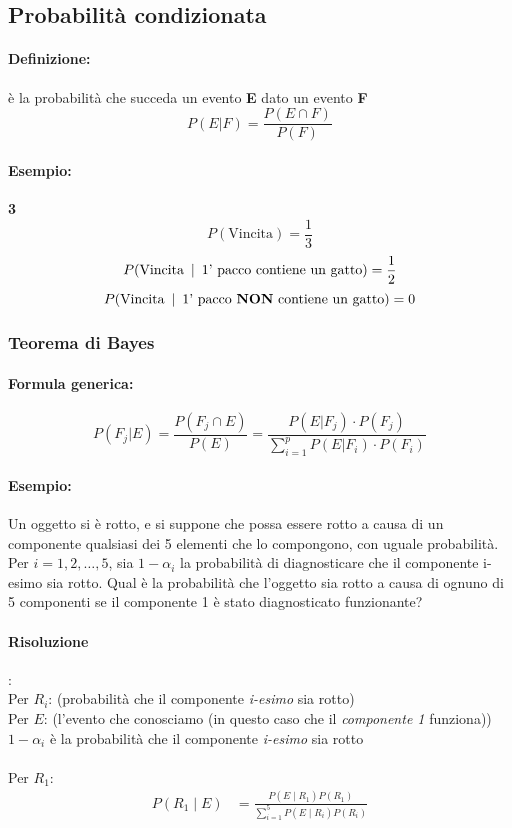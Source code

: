 \documentclass[]{article}
\newcommand{\definizione}{\paragraph{Definizione:}}
\newcommand{\formula}{\paragraph{Formula generica:}}
\begin{document}
    \subsection{Probabilità condizionata}
    \definizione è la probabilità che succeda un evento \textbf{E} dato un evento \textbf{F}
    \[ P(E | F) = \frac{P(E \cap F)}{P(F)}\]
    \paragraph{Esempio:} \textbf{3}  \\
    \[ P(\text{Vincita}) = \frac{1}{3}\]
    \[ P(\text{Vincita} \hspace{0.5em} | \hspace{0.5em} \text{1' pacco contiene un gatto}) = \frac{1}{2}\]
    \[ P(\text{Vincita} \hspace{0.5em} | \hspace{0.5em} \text{1' pacco \textbf{NON} contiene un gatto}) = 0\]



    \subsubsection{Teorema di Bayes}
    \formula \[ P(F_j | E) = \frac{P(F_j \cap E)}{P(E)} = \frac{P(E | F_j) \cdot P(F_j)}{\sum_{i = 1}^{p} P(E | F_i) \cdot P(F_i)} \]
    \begin{center} 
    \end{center}
    \paragraph{Esempio:}
    Un oggetto si è rotto, e si suppone che possa essere rotto a causa di un componente qualsiasi dei 5 elementi che lo compongono, con uguale probabilità. Per $i=1,2, \ldots, 5$, sia $1-\alpha_i$ la probabilità di diagnosticare che il componente i-esimo sia rotto. Qual è la probabilità che l'oggetto sia rotto a causa di ognuno di 5 componenti se il componente 1 è stato diagnosticato funzionante?

    \paragraph{Risoluzione}: \\
    Per $R_i$: (probabilità che il componente \textit{i-esimo} sia rotto) \\
    Per $E$: (l'evento che conosciamo (in questo caso che il \textit{componente 1} funziona)) \\
    $1 - \alpha_i$ è la probabilità che il componente \textit{i-esimo} sia rotto \\ \\
    Per $R_1$:
    $$
        \begin{aligned}
            P\left(R_1 \mid E\right) & =\frac{P\left(E \mid R_1\right) P\left(R_1\right)}{\sum_{i=1}^5 P\left(E \mid R_i\right) P\left(R_i\right)} \\
        \end{aligned}
    $$
\end{document}
